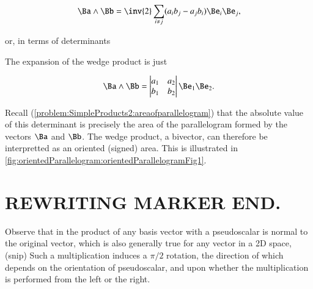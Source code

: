 \begin{dmath}\label{eqn:SimpleProducts2:1300}
\Ba \wedge \Bb
=
\inv{2} \sum_{i \ne j} (a_i b_j - a_j b_i) \Be_i \Be_j,
\end{dmath}

or, in terms of determinants

The  expansion of the wedge product is just

\begin{dmath}\label{eqn:SimpleProducts2:1340}
\Ba \wedge \Bb
=
\begin{vmatrix}
a_1 & a_2 \\
b_1 & b_2
\end{vmatrix}
\Be_1 \Be_2.
\end{dmath}

Recall (\cref{problem:SimpleProducts2:areaofparallelogram}) that the absolute value of this determinant is precisely the area of the parallelogram formed by the vectors \( \Ba \) and \( \Bb \).  The wedge product, a bivector, can therefore be interpretted as an oriented (signed) area.  This is illustrated in \cref{fig:orientedParallelogram:orientedParallelogramFig1}.




\section{REWRITING MARKER END.}

Observe that in  the product of any basis vector with a pseudoscalar is normal to the original vector, which is also generally true for any vector in a 2D space,
(snip)
Such a multiplication induces a \( \pi/2 \) rotation, the direction of which depends on the orientation of pseudoscalar, and upon whether the multiplication is performed from the left or the right.

